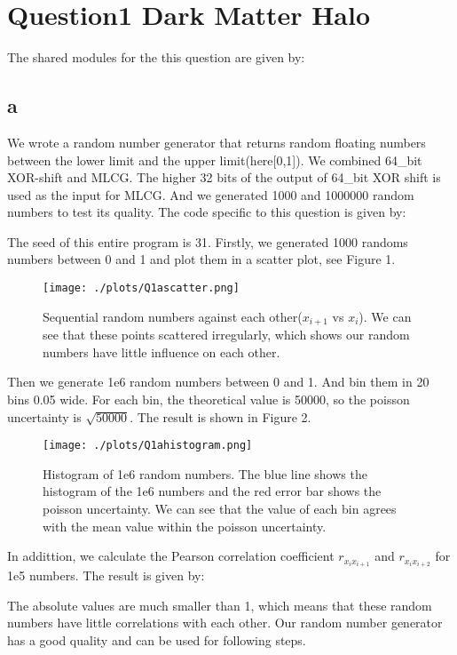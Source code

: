 \section{Question1 Dark Matter Halo}

The shared modules for the this question are given by:


\subsection{a}
We wrote a random number generator that returns random floating numbers between the lower limit and the upper limit(here[0,1]). We combined 64\_bit XOR-shift and MLCG. The higher 32 bits of the output of 64\_bit XOR shift is used as the input for MLCG.
And we generated 1000 and 1000000 random numbers to test its quality.
The code specific to this question is given by:


The seed of this entire program is 31. Firstly, we generated 1000 randoms numbers between 0 and 1 and plot them in a scatter plot, see Figure 1.

\begin{figure}[h!]
  \centering
  \texttt{[image: ./plots/Q1ascatter.png]}
  \caption{Sequential random numbers against each other($x_{i+1}$ vs $x_{i}$). We can see that these points scattered irregularly, which shows our random numbers have little influence on each other.}
  \label{fig1}
\end{figure}

Then we generate 1e6 random numbers between 0 and 1. And bin them in 20 bins 0.05 wide. For each bin, the theoretical value is 50000, so the poisson uncertainty is $\sqrt{50000}$. The result is shown in Figure 2.
\begin{figure}[h!]
  \centering
  \texttt{[image: ./plots/Q1ahistogram.png]}
  \caption{Histogram of 1e6 random numbers. The blue line shows the histogram of the 1e6 numbers and the red error bar shows the poisson uncertainty. We can see that the value of each bin agrees with the mean value within the poisson uncertainty. }
  \label{fig2}
\end{figure}

In addittion, we calculate the Pearson correlation coefficient $r_{x_i x_{i+1}}$ and $r_{x_i x_{i+2}}$ for 1e5 numbers. The result is given by:

The absolute values are much smaller than 1, which means that these random numbers have little correlations with each other. Our random number generator has a good quality and can be used for following steps.

